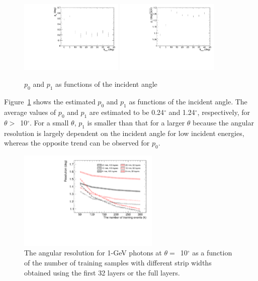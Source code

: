 \documentclass[preprint,12pt,times,a4paper]{elsarticle}
\begin{document}
\begin{figure}[!hbt]
\centering
\includegraphics[width=0.44\textwidth]{figures/Fig7_p0.pdf}
\includegraphics[width=0.44\textwidth]{figures/Fig7_p1.pdf}
\caption{ $p_{0}$ and $p_{1}$ as functions of the incident angle }
\label{fig:res_edep}
\end{figure}

Figure~\ref{fig:res_edep} shows the estimated $p_{0}$ and $p_{1}$ as functions of the incident angle. The average values of $p_{0}$ and $p_{1}$ are estimated to be 0.24$^{\circ}$ and 1.24$^{\circ}$, respectively, for $\theta>$~10$^{\circ}$. For a small $\theta$, $p_{1}$ is smaller than that for a larger $\theta$ because the angular resolution is largely dependent on the incident angle for low incident energies, whereas the opposite trend can be observed for $p_{0}$.

\begin{figure}[!hbt]
\centering
\includegraphics[width=0.6\textwidth]{figures/Fig8_nsample.pdf}
\caption{ The angular resolution for 1-GeV photons at $\theta=$~10$^{\circ}$ as a function of the number of training samples with different strip widths obtained using the first 32 layers or the full layers. }
\label{fig:multi-parameter}
\end{figure}
\end{document}
